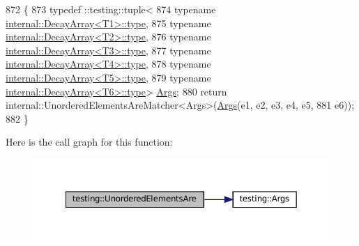 \begin{DoxyCode}
872                                 \{
873   typedef ::testing::tuple<
874       \textcolor{keyword}{typename} \hyperlink{namespacegenerate__debs_a50bc9a7ecac9584553e089a448bcde58}{internal::DecayArray<T1>::type},
875       \textcolor{keyword}{typename} \hyperlink{namespacegenerate__debs_a50bc9a7ecac9584553e089a448bcde58}{internal::DecayArray<T2>::type},
876       \textcolor{keyword}{typename} \hyperlink{namespacegenerate__debs_a50bc9a7ecac9584553e089a448bcde58}{internal::DecayArray<T3>::type},
877       \textcolor{keyword}{typename} \hyperlink{namespacegenerate__debs_a50bc9a7ecac9584553e089a448bcde58}{internal::DecayArray<T4>::type},
878       \textcolor{keyword}{typename} \hyperlink{namespacegenerate__debs_a50bc9a7ecac9584553e089a448bcde58}{internal::DecayArray<T5>::type},
879       \textcolor{keyword}{typename} \hyperlink{namespacegenerate__debs_a50bc9a7ecac9584553e089a448bcde58}{internal::DecayArray<T6>::type}> 
      \hyperlink{namespacetesting_a09ac462e8d6ed468cbfaa9c767aee0aa}{Args};
880   \textcolor{keywordflow}{return} internal::UnorderedElementsAreMatcher<Args>(\hyperlink{namespacetesting_a09ac462e8d6ed468cbfaa9c767aee0aa}{Args}(e1, e2, e3, e4, e5,
881       e6));
882 \}
\end{DoxyCode}
Here is the call graph for this function\+:
\nopagebreak
\begin{figure}[H]
\begin{center}
\leavevmode
\includegraphics[width=350pt]{namespacetesting_aff1859501ecd94dd1bc428d146a66fdc_cgraph}
\end{center}
\end{figure}
\mbox{\label{namespacetesting_add6e16fe24c45e39e92c0d19c04acf11}} 
